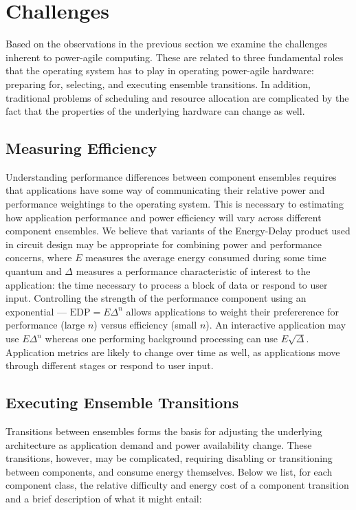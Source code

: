 \section{Challenges}

Based on the observations in the previous section we examine the challenges
inherent to power-agile computing. These are related to three fundamental
roles that the operating system has to play in operating power-agile
hardware: preparing for, selecting, and executing ensemble transitions. In
addition, traditional problems of scheduling and resource allocation are
complicated by the fact that the properties of the underlying hardware can
change as well.

\subsection{Measuring Efficiency}

Understanding performance differences between component ensembles requires
that applications have some way of communicating their relative power and
performance weightings to the operating system. This is necessary to
estimating how application performance and power efficiency will vary across
different component ensembles. We believe that variants of the Energy-Delay
product used in circuit design may be appropriate for combining power and
performance concerns, where $E$ measures the average energy consumed during
some time quantum and $\Delta$ measures a performance characteristic of
interest to the application: the time necessary to process a block of data or
respond to user input. Controlling the strength of the performance component
using an exponential --- $\textrm{EDP} = E\Delta^n$ allows applications to
weight their prefererence for performance (large $n$) versus efficiency
(small $n$). An interactive application may use $E\Delta^n$ whereas one
performing background processing can use $E\sqrt{\Delta}$. Application
metrics are likely to change over time as well, as applications move through
different stages or respond to user input.

\subsection{Executing Ensemble Transitions}

Transitions between ensembles forms the basis for adjusting the underlying
architecture as application demand and power availability change. These
transitions, however, may be complicated, requiring disabling or
transitioning between components, and consume energy themselves. Below we
list, for each component class, the relative difficulty and energy cost of a
component transition and a brief description of what it might entail:

